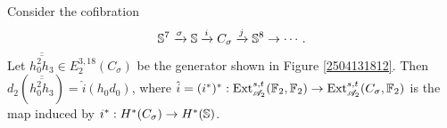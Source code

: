 \documentclass{MetricNotes2023}
\def\bb{\ensuremath\mathbb}
\def\A{\ensuremath{\mathscr{A}_2}}
\DeclareMathOperator{\Ext}{Ext}
\begin{document}
\begin{lemma}\label{2504131851}
Consider the cofibration
\[\bb{S}^7 \xrightarrow{\sigma} \bb{S} \xrightarrow{i} C_\sigma \xrightarrow{j} \bb{S}^8\to \cdots.\]
Let \(\overline{\overline{h_0^2h_3}}\in E_2^{3,18}(C_\sigma)\) be the generator shown in Figure \ref{2504131812}. Then \(d_2(\overline{\overline{h_0^2h_3}})=\hat i(h_0d_0)\), where \(\hat i = (i^*)^* : \Ext_{\A}^{s,t}(\bb{F}_2, \bb{F}_2)\to \Ext_{\A}^{s,t}(C_\sigma, \bb{F}_2)\) is the map induced by \(i^* : H^*(C_\sigma)\to H^*(\bb{S})\). %
\end{lemma}
\end{document}
